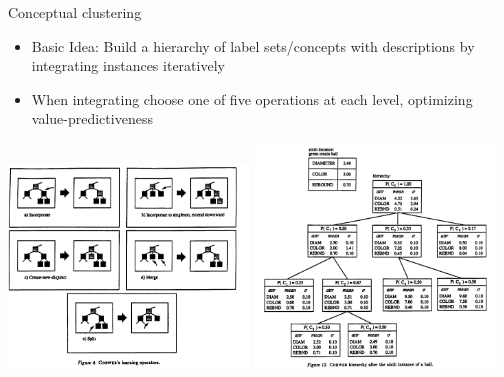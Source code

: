 \documentclass[rgb]{beamer}
\begin{document}
        \begin{frame}{Conceptual clustering}
            \begin{itemize}
                \item Basic Idea: Build a hierarchy of label sets/concepts with descriptions by integrating instances iteratively
                \item When integrating choose one of five operations at each level, optimizing value-predictiveness~\cite{gennari1989models, mckusick1990cobweb, corter1992explaining, gluck1985information}
            \end{itemize}
            \centering\includegraphics[keepaspectratio,width=0.48\textwidth,height=0.6\textheight]{img/cobweb_ops.png} \hspace{2cm}
            \includegraphics[keepaspectratio,width=0.48\textwidth,height=0.6\textheight]{img/cobweb_ex.png}
        \end{frame}
    
\end{document}

